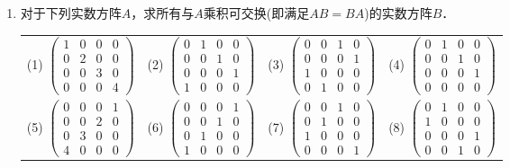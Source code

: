 \documentclass[a4paper,fontset=windows]{ctexbook}
\theoremstyle{definition}
\begin{document}
\begin{enumerate}
\item 对于下列实数方阵$A$，求所有与$A$乘积可交换(即满足$AB=BA$)的实数方阵$B$．

\hspace*{-6pt}\begin{tabular}{llll}
(1) $\begin{pmatrix}1&0&0&0 \\ 0&2&0&0 \\ 0&0&3&0 \\ 0&0&0&4\end{pmatrix}$ &
(2) $\begin{pmatrix}0&1&0&0 \\ 0&0&1&0 \\ 0&0&0&1 \\ 1&0&0&0\end{pmatrix}$ &
(3) $\begin{pmatrix}0&0&1&0 \\ 0&0&0&1 \\ 1&0&0&0 \\ 0&1&0&0\end{pmatrix}$ &
(4) $\begin{pmatrix}0&1&0&0 \\ 0&0&1&0 \\ 0&0&0&1 \\ 0&0&0&0\end{pmatrix}$ \\
(5) $\begin{pmatrix}0&0&0&1 \\ 0&0&2&0 \\ 0&3&0&0 \\ 4&0&0&0\end{pmatrix}$ &
(6) $\begin{pmatrix}0&0&0&1 \\ 0&0&1&0 \\ 0&1&0&0 \\ 1&0&0&0\end{pmatrix}$ &
(7) $\begin{pmatrix}0&0&1&0 \\ 0&1&0&0 \\ 1&0&0&0 \\ 0&0&0&1\end{pmatrix}$ &
(8) $\begin{pmatrix}0&1&0&0 \\ 1&0&0&0 \\ 0&0&0&1 \\ 0&0&1&0\end{pmatrix}$
\end{tabular}


\end{enumerate}
\end{document}
